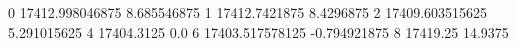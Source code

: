 0 17412.998046875 8.685546875
1 17412.7421875 8.4296875
2 17409.603515625 5.291015625
4 17404.3125 0.0
6 17403.517578125 -0.794921875
8 17419.25 14.9375

